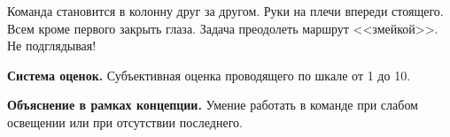 
\par Команда становится в колонну друг за другом. Руки на плечи впереди стоящего. Всем кроме первого закрыть глаза. Задача преодолеть маршрут <<змейкой>>. Не подглядывая!

\par \textbf{Система оценок.} Субъективная оценка проводящего по шкале от 1 до 10.

\par \textbf{Объяснение в рамках концепции.} Умение работать в команде при слабом освещении или при отсутствии последнего.